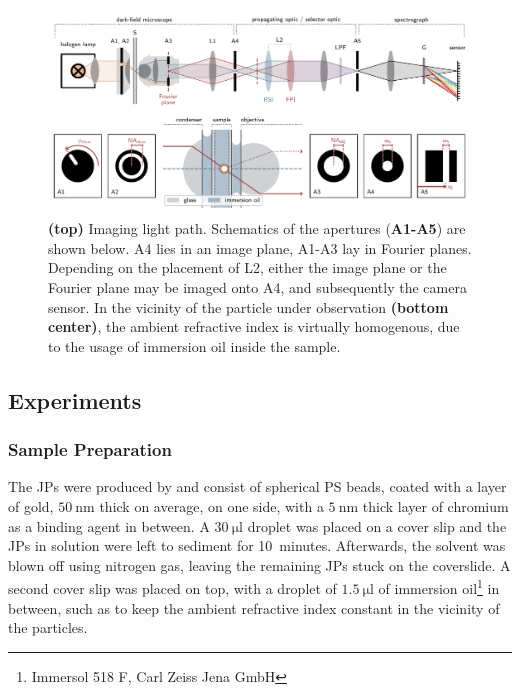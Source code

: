 \documentclass[10pt]{article}
\begin{document}
\begin{figure}[htbp]
    \centering
    \includegraphics[width=\textwidth]{[fig] setup}
    \caption{
    {\sffamily\bfseries (top)} Imaging light path. %
    Schematics of the apertures ({\sffamily\bfseries A1-A5}) are shown below. 
    {\sffamily A4} lies in an image plane, {\sffamily A1-A3} lay in Fourier planes. Depending on the placement of {\sffamily L2}, either the image plane or the Fourier plane may be imaged onto {\sffamily A4}, and subsequently the camera sensor. 
    In the vicinity of the particle under observation {\sffamily\bfseries (bottom center)}, the ambient refractive index is virtually homogenous, due to the usage of immersion oil inside the sample.  
    }
    \label{fig:setup}
\end{figure}

\subsection*{Experiments}

\subsubsection*{Sample Preparation}

The JPs were produced by  and consist of spherical PS beads, coated with a layer of gold, $\SI{50}{\nano\meter}$ thick on average, on one side, with a $\SI{5}{\nano\meter}$ thick layer of chromium as a binding agent in between. 
A $\SI{30}{\micro\litre}$ droplet was placed on a cover slip and the JPs in solution were left to sediment for \mbox{10 minutes}. 
Afterwards, the solvent was blown off using nitrogen gas, leaving the remaining JPs stuck on the coverslide. 
A second cover slip was placed on top, with a droplet of $\SI{1.5}{\micro\litre}$ of immersion oil\footnote{\sffamily Immersol 518 F, Carl Zeiss Jena GmbH} in between, such as to keep the ambient refractive index constant in the vicinity of the particles.   
\end{document}
